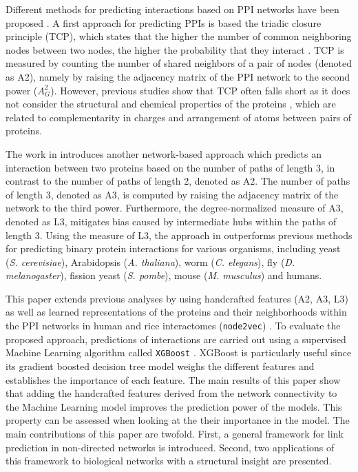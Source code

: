 Different methods for predicting interactions based on PPI networks have
been proposed \cite{Chang2016PPI,Chen2019PPI,Kotlyar2015PPI}. A first 
approach for predicting PPIs is based the triadic closure principle
(TCP), which states that the higher the number of common neighboring
nodes between two nodes, the higher the probability that they interact
\cite{Goldberg2003SmallWorld}. TCP is measured by counting the number 
of shared neighbors of a pair of nodes (denoted as A2), namely by raising the adjacency
matrix of the PPI network to the second power ($A_G^2$). 
However, previous studies show that TCP often falls short as it does 
not consider the structural and chemical properties of the proteins
\cite{Cannistraci2013Networks}, which are related to 
complementarity in charges and arrangement of atoms between pairs of proteins.

The work in \cite{Kovacs2019} introduces another network-based approach which predicts
an interaction between two proteins based on the number of paths
of length 3, in contrast to the number of paths of length 2, denoted as A2. 
The number of paths of length 3, denoted as A3, is computed by raising
the adjacency matrix of the network to the third power. Furthermore, the 
degree-normalized measure of A3, denoted as L3,  mitigates bias caused by
intermediate hubs within the paths of length 3. Using the measure of L3, 
the approach in \cite{Kovacs2019} outperforms previous methods for predicting
binary protein interactions for various organisms, including yeast (\emph{S. cerevisiae}),
Arabidopsis (\emph{A. thaliana}), worm (\emph{C. elegans}), fly (\emph{D. melanogaster}),
fission yeast (\emph{S. pombe}), mouse (\emph{M. musculus}) and humans.

This paper extends previous analyses by using handcrafted features (A2,
A3, L3) as well as learned representations of the proteins and their 
neighborhoods within the PPI networks in human and rice 
interactomes (\texttt{node2vec}) \cite{Grover_2016}. To evaluate the 
proposed approach, predictions of interactions are carried out 
using a supervised Machine Learning algorithm called \texttt{XGBoost} 
\cite{2016ChenXGB}. XGBoost is particularly useful since its gradient 
boosted decision tree model weighs the different features and 
establishes the importance of each feature. The main results of this paper 
show that adding the handcrafted features derived from the
network connectivity to the Machine Learning model improves the prediction
power of the models. This property can be assessed when looking at the their
importance in the model. The main contributions of this paper are twofold. 
First, a general framework for link prediction in non-directed networks is 
introduced. Second, two applications of this framework to biological networks 
with a structural insight are presented.

